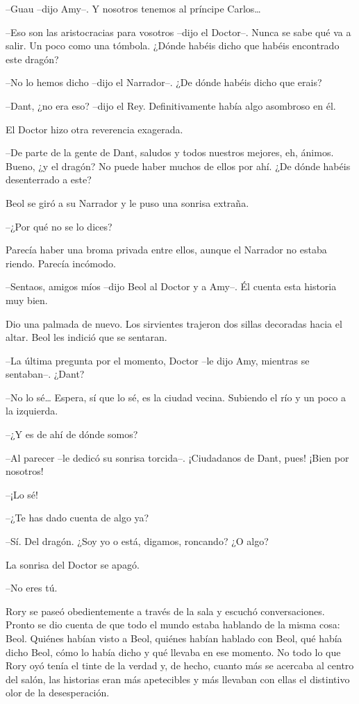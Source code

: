 {--Guau --dijo Amy--. Y nosotros tenemos al príncipe Carlos\ldots{}}

{--Eso son las aristocracias para vosotros --dijo el Doctor--. Nunca
	se sabe qué va a salir. Un poco como una tómbola. ¿Dónde habéis dicho
que habéis encontrado este dragón?}

{--No lo hemos dicho --dijo el Narrador--. ¿De dónde habéis dicho que
erais?}

{--Dant, ¿no era eso? --dijo el Rey. Definitivamente había algo
asombroso en él.}

{El Doctor hizo otra reverencia exagerada.}

{--De parte de la gente de Dant, saludos y todos nuestros mejores, eh,
	ánimos. Bueno, ¿y el dragón? No puede haber muchos de ellos por ahí. ¿De
dónde habéis desenterrado a este?}

{Beol se giró a su Narrador y le puso una sonrisa extraña.}

{--¿Por qué no se lo dices?}

{Parecía haber una broma privada entre ellos, aunque el Narrador no
estaba riendo. Parecía incómodo.}

{--Sentaos, amigos míos --dijo Beol al Doctor y a Amy--. Él cuenta
esta historia muy bien.}

{Dio una palmada de nuevo. Los sirvientes trajeron dos sillas decoradas
hacia el altar. Beol les indició que se sentaran.}

{--La última pregunta por el momento, Doctor --le dijo Amy, mientras
se sentaban--. ¿Dant?}

{--No lo sé\ldots{} Espera, sí que lo sé, es la ciudad vecina.
Subiendo el río y un poco a la izquierda.}

{--¿Y es de ahí de dónde somos?}

{--Al parecer --le dedicó su sonrisa torcida--. ¡Ciudadanos de Dant,
pues! ¡Bien por nosotros!}

{--¡Lo sé!}

{--¿Te has dado cuenta de algo ya?}

{--Sí. Del dragón. ¿Soy yo o está, digamos, roncando? ¿O algo?}

{La sonrisa del Doctor se apagó.}

{--No eres tú.}

\mbox{}

{Rory se paseó obedientemente a través de la sala y escuchó
	conversaciones. Pronto se dio cuenta de que todo el mundo estaba
	hablando de la misma cosa: Beol. Quiénes habían visto a Beol, quiénes
	habían hablado con Beol, qué había dicho Beol, cómo lo había dicho y qué
	llevaba en ese momento. No todo lo que Rory oyó tenía el tinte de la
	verdad y, de hecho, cuanto más se acercaba al centro del salón, las
	historias eran más apetecibles y más llevaban con ellas el distintivo
olor de la desesperación.}

